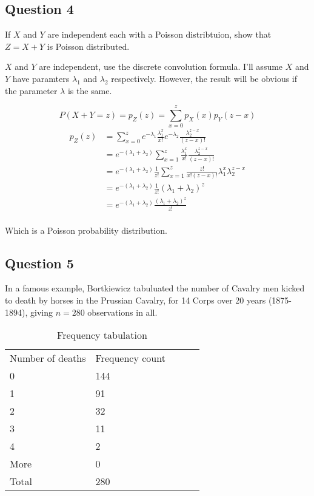 \documentclass{tufte-book}
\theoremstyle{mytheoremstyle}
\theoremstyle{mylemstyle}
\theoremstyle{mydefstyle}
\begin{document}
\subsection{Question 4}
If $X$ and $Y$ are independent each with a Poisson distribtuion, show that $Z=X+Y$ is Poisson distributed.

 $X$ and $Y$ are independent, use the discrete convolution formula.  I'll assume $X$ and $Y$ have paramters $\lambda_1$ and $\lambda_2$ respectively.  However, the result will be obvious if the parameter $\lambda$ is the same.

\[ P(X+Y=z) = p_Z(z) = \sum_{x=0}^z p_X(x) p_Y(z-x) \]
\begin{align*}
p_Z(z) &= \sum_{x=0}^z e^{-\lambda_1} \frac{\lambda_1^x}{x!} e^{-\lambda_2} \frac{\lambda_2^{z-x}}{(z-x)!}\\
&= e^{-(\lambda_1 + \lambda_2)} \sum_{x=1}^z \frac{\lambda_1^x}{x!} \frac{\lambda_2^{z-x}}{(z-x)!}\\
&= e^{-(\lambda_1 + \lambda_2)}\frac{1}{z!} \sum_{x=1}^z \frac{z!}{x!(z-x)!} \lambda_1^x \lambda_2^{z-x}\\
&= e^{-(\lambda_1 + \lambda_2)}\frac{1}{z!} (\lambda_1+\lambda_2)^z\\
&= e^{-(\lambda_1 + \lambda_2)}\frac{(\lambda_1+\lambda_2)^z}{z!}\\
\end{align*}

Which is a Poisson probability distribution.

\subsection{Question 5}
In a famous example, Bortkiewicz tabuluated the number of Cavalry men kicked to death by horses in the Prussian Cavalry, for 14 Corps over 20 years (1875-1894), giving $n=280$ observations in all.

\begin{table}
\centering
\caption{Frequency tabulation}
\label{freq-tab}
\begin{tabular}{|l|l|lll}
\cline{1-2}
Number of deaths & Frequency count \\ \cline{1-2}
0                & 144             \\ \cline{1-2}
1                & 91              \\ \cline{1-2}
2                & 32              \\ \cline{1-2}
3                & 11              \\ \cline{1-2}
4                & 2               \\ \cline{1-2}
More             & 0               \\ \cline{1-2}
Total            & 280             \\ \cline{1-2}
\end{tabular}
\end{table}
\end{document}
